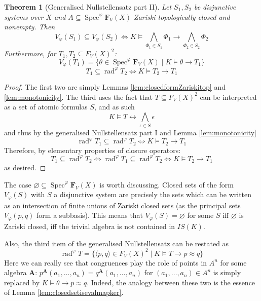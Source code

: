 \documentclass{article}
\theoremstyle{plain}
\newtheorem{theorem}{Theorem}[section]
\theoremstyle{definition}
\newcommand{\Spec}{\operatorname{Spec}}
\newcommand{\rad}{\operatorname{rad}}
\begin{document}
\begin{theorem} [Generalised Nullstellensatz part II]
    Let $S_1, S_2$ be disjunctive systems over $X$ and $A \subseteq \Spec^\varphi\mathbf{F}_V(X)$ Zariski topologically closed and nonempty.
    Then
    $$V_\varphi(S_1) \subseteq V_\varphi(S_2) \iff K \models \bigwedge_{\Phi_1  \in S_1} \Phi_1 \rightarrow \bigwedge_{\Phi_2 \in S_2} \Phi_2$$
    Furthermore, for $T_1, T_2 \subseteq F_V(X)^2$:
    $$V_\varphi(T_1) = \{ \theta  \in \Spec^\varphi\mathbf{F}_V(X) \mid K\models \theta\rightarrow T_1\}$$
    $$T_1\subseteq \rad^\varphi T_2  \iff K\models T_2 \rightarrow T_1$$
\end{theorem}
\begin{proof}
    The first two are simply Lemmas \ref{lem:closedformZariskitop} and \ref{lem:monotonicity}.
    The third uses the fact that $T \subseteq F_V(X)^2$ can be interpreted as a set of atomic formulas $S$, and as such
    $$K \models T \leftrightarrow \bigwedge_{\epsilon \in S} \epsilon$$
    and thus by the generalised Nullstellensatz part I and Lemma \ref{lem:monotonicity}
    $$\rad^\varphi T_1 \subseteq \rad^\varphi T_2 \iff K  \models T_2 \rightarrow T_1$$
    Therefore, by elementary properties of closure operators:
    $$T_1 \subseteq \rad^\varphi T_2 \iff \rad^\varphi T_1 \subseteq \rad^\varphi T_2  \iff K \models T_2 \rightarrow T_1$$
    as desired.
\end{proof}

The case $\varnothing \subseteq \Spec^\varphi\mathbf{F}_V(X)$ is worth discussing.
Closed sets of the form $V_\varphi(S)$ with $S$ a disjunctive system are precisely the sets which can be written as an intersection of finite unions of Zariski closed sets (as the principal sets $V_\varphi(p, q)$ form a subbasis).
This means that $V_\varphi(S) = \varnothing$ for some $S$ iff $\varnothing$ is Zariski closed, iff the trivial algebra is not contained in $IS(K)$.


Also, the third item of the generalised Nullstellensatz can be restated as
$$\rad^\varphi T = \{ \langle p, q\rangle \in F_V(X)^2 \mid K\models T \rightarrow p\approx q\}$$
Here we can really see that congruences play the role of points in $A^ n$ for some algebra $\mathbf{A}$: $p^\mathbf{A}(a_1, \dots, a_n) = q^\mathbf{A}(a_1, \dots, a_n)$ for $(a_1, \dots, a_n) \in A^n$ is simply replaced by $K\models \theta \rightarrow p\approx q$.
Indeed, the analogy between these two is the essence of Lemma \ref{lem:closedsetisevalmapker}.
\end{document}
